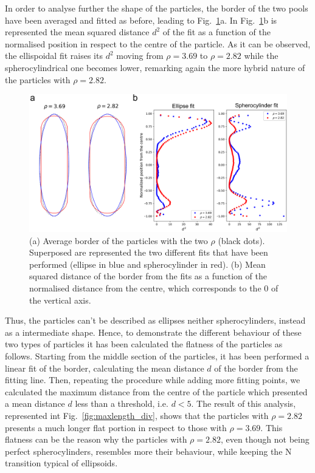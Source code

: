 \documentclass[aip,graphicx]{revtex4-1} %
\begin{document}
In order to analyse further the shape of the particles, the border of the two pools have been averaged and fitted as before, leading to Fig.~\ref{fig:Mean_bord}a. 
In Fig.~\ref{fig:Mean_bord}b is represented the mean squared distance $d^2$ of the fit as a function of the normalised position in respect
to the centre of the particle. As it can be observed, the ellispoidal fit raises its $d^2$ moving from $\rho=3.69$ to $\rho=2.82$ while the spherocylindrical
one becomes lower, remarking again the more hybrid nature of the particles with $\rho=2.82$.
\begin{figure}
    \centering
    \includegraphics[width=0.7\columnwidth]{Mean_bord.png}
\caption{(a) Average border of the particles with the two $\rho$ (black dots). Superposed are represented the two different fits that have been performed (ellipse in blue and spherocylinder in red). (b) Mean squared distance of the border from the fits as a function of the normalised distance from the centre, which corresponds to the $0$ of the vertical axis.}\label{fig:Mean_bord}
\end{figure}
Thus, the particles can't be described as ellipses neither spherocylinders, instead as a intermediate shape. Hence, to demonstrate the different behaviour of
these two types of particles it has been calculated the flatness of the particles as follows. Starting from the middle section of the particles, it has been
performed a linear fit of the border, calculating the mean distance $d$ of the border from the fitting line. Then, repeating the procedure while adding more
fitting points, we calculated the maximum distance from the centre of the particle which presented a mean distance $d$ less than a threshold, i.e. $d < 5$. The
result of this analysis, represented int Fig.~\ref{fig:maxlength_div}, shows that the particles with $\rho=2.82$ presents a much longer flat portion in respect
to those with $\rho=3.69$. This flatness can be the reason why the particles with $\rho=2.82$, even though not being perfect spherocylinders, resembles more
their behaviour, while keeping the N transition typical of ellipsoids. 
\end{document}
